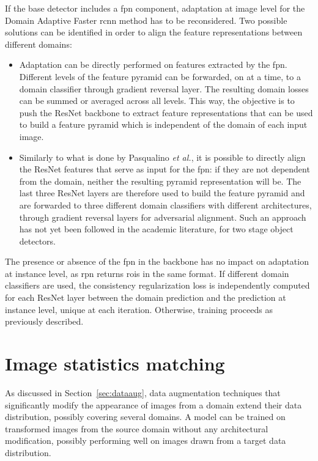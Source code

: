 \documentclass[%
    corpo=12pt,
    twoside,
    stile=classica,   
    tipotesi=magistrale,
    evenboxes,
    english,
	numerazioneromana,
]{toptesi}
\begin{document}
\bigskip
If the base detector includes a \gls{fpn} component, adaptation at image level for the Domain Adaptive Faster \gls{rcnn} method has to be reconsidered. Two possible solutions can be identified in order to align the feature representations between different domains:
\begin{itemize}
	\item Adaptation can be directly performed on features extracted by the \gls{fpn}. Different levels of the feature pyramid can be forwarded, on at a time, to a domain classifier through gradient reversal layer. The resulting domain losses can be summed or averaged across all levels. This way, the objective is to push the ResNet backbone to extract feature representations that can be used to build a feature pyramid which is independent of the domain of each input image.
	\item Similarly to what is done by Pasqualino \textit{et al.}\cite{pasqualino2020unsupervised}, it is possible to directly align the ResNet features that serve as input for the \gls{fpn}: if they are not dependent from the domain, neither the resulting pyramid representation will be. The last three ResNet layers are therefore used to build the feature pyramid and are forwarded to three different domain classifiers with different architectures, through gradient reversal layers for adversarial alignment. Such an approach has not yet been followed in the academic literature, for two stage object detectors.
\end{itemize}
The presence or absence of the \gls{fpn} in the backbone has no impact on adaptation at instance level, as \gls{rpn} returns \glspl{roi} in the same format. If different domain classifiers are used, the consistency regularization loss is independently computed for each ResNet layer between the domain prediction and the prediction at instance level, unique at each iteration. Otherwise, training proceeds as previously described.

\section{Image statistics matching}
As discussed in Section~\ref{sec:dataaug}, data augmentation techniques that significantly modify the appearance of images from a domain extend their data distribution, possibly covering several domains. A model can be trained on transformed images from the source domain without any architectural modification, possibly performing well on images drawn from a target data distribution.
\end{document}
